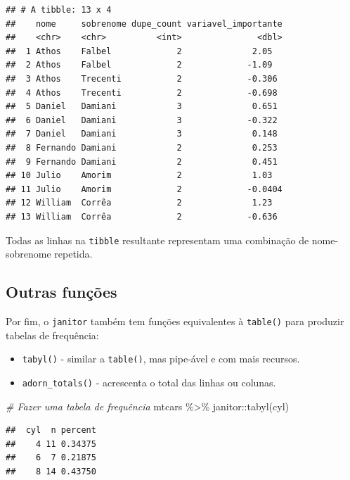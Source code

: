 \documentclass[
]{book}
\newenvironment{Shaded}{\begin{snugshade}}{\end{snugshade}}
\newcommand{\CommentTok}[1]{\textcolor[rgb]{0.56,0.35,0.01}{\textit{#1}}}
\newcommand{\FunctionTok}[1]{\textcolor[rgb]{0.00,0.00,0.00}{#1}}
\newcommand{\NormalTok}[1]{#1}
\newcommand{\SpecialCharTok}[1]{\textcolor[rgb]{0.00,0.00,0.00}{#1}}
\providecommand{\tightlist}{%
  \setlength{\itemsep}{0pt}\setlength{\parskip}{0pt}}
\begin{document}
\begin{verbatim}
## # A tibble: 13 x 4
##    nome     sobrenome dupe_count variavel_importante
##    <chr>    <chr>          <int>               <dbl>
##  1 Athos    Falbel             2              2.05  
##  2 Athos    Falbel             2             -1.09  
##  3 Athos    Trecenti           2             -0.306 
##  4 Athos    Trecenti           2             -0.698 
##  5 Daniel   Damiani            3              0.651 
##  6 Daniel   Damiani            3             -0.322 
##  7 Daniel   Damiani            3              0.148 
##  8 Fernando Damiani            2              0.253 
##  9 Fernando Damiani            2              0.451 
## 10 Julio    Amorim             2              1.03  
## 11 Julio    Amorim             2             -0.0404
## 12 William  Corrêa             2              1.23  
## 13 William  Corrêa             2             -0.636
\end{verbatim}

Todas as linhas na \texttt{tibble} resultante representam uma combinação de nome-sobrenome repetida.

\hypertarget{outras-funuxe7uxf5es}{%
\subsection{Outras funções}\label{outras-funuxe7uxf5es}}

Por fim, o \texttt{janitor} também tem funções equivalentes à \texttt{table()} para produzir tabelas de frequência:

\begin{itemize}
\tightlist
\item
  \texttt{tabyl()} - similar a \texttt{table()}, mas pipe-ável e com mais recursos.
\item
  \texttt{adorn\_totals()} - acrescenta o total das linhas ou colunas.
\end{itemize}

\begin{Shaded}
\begin{Highlighting}[]
\CommentTok{\# Fazer uma tabela de frequência}
\NormalTok{mtcars }\SpecialCharTok{\%\textgreater{}\%}\NormalTok{ janitor}\SpecialCharTok{::}\FunctionTok{tabyl}\NormalTok{(cyl)}
\end{Highlighting}
\end{Shaded}

\begin{verbatim}
##  cyl  n percent
##    4 11 0.34375
##    6  7 0.21875
##    8 14 0.43750
\end{verbatim}
\end{document}
